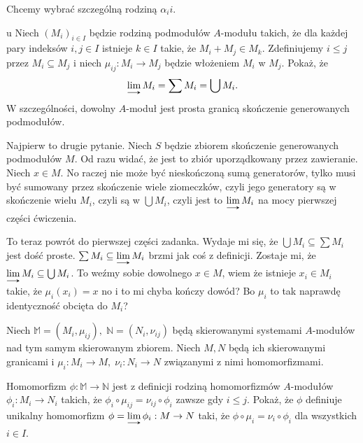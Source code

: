 \documentclass{article}
\begin{document}
Chcemy wybrać szczególną rodziną $\alpha_ii$. 

\begin{problem}[17]{u}
Niech $(M_i)_{i\in I}$ będzie rodziną podmodułów $A$-modułu takich, że dla każdej pary indeksów $i,j\in I$ istnieje $k\in I$ takie, że $M_i+M_j\in M_k$. Zdefiniujemy $i\leq j$ przez $M_i\subseteq M_j$ i niech $\mu_{ij}:M_i\to M_j$ będzie włożeniem $M_i$ w $M_j$. Pokaż, że
$$\dlim M_i=\sum M_i=\bigcup M_i.$$
W szczególności, dowolny $A$-moduł jest prosta granicą skończenie generowanych podmodułów.
\end{problem}

Najpierw to drugie pytanie. Niech $S$ będzie zbiorem skończenie generowanych podmodułów $M$. Od razu widać, że jest to zbiór uporządkowany przez zawieranie. Niech $x\in M$. No raczej nie może być nieskończoną sumą generatorów, tylko musi być sumowany przez skończenie wiele ziomeczków, czyli jego generatory są w skończenie wielu $M_i$, czyli są w $\bigcup M_i$, czyli jest to $\dlim M_i$ na mocy pierwszej części ćwiczenia.

To teraz powrót do pierwszej części zadanka. Wydaje mi się, że $\bigcup M_i\subseteq\sum M_i$ jest dość proste. $\sum M_i\subseteq\dlim M_i$ brzmi jak coś z definicji. Zostaje mi, że $\dlim M_i\subseteq\bigcup M_i$. To weźmy sobie dowolnego $x\in M$, wiem że istnieje $x_i\in M_i$ takie, że $\mu_i(x_i)=x$ no i to mi chyba kończy dowód? Bo $\mu_i$ to tak naprawdę identyczność obcięta do $M_i$? 

\begin{problem}[18]{}
Niech $\mathbb{M}=(M_i,\mu_{ij}),\;\mathbb{N}=(N_i,\nu_{ij})$ będą skierowanymi systemami $A$-modułów nad tym samym skierowanym zbiorem. Niech $M,N$ będą ich skierowanymi granicami i $\mu_i:M_i\to M,\;\nu_{i}:N_i\to N$ związanymi z nimi homomorfizmami.

Homomorfizm $\mathbb{\phi}:\mathbb{M}\to\mathbb{N}$ jest z definicji rodziną homomorfizmów $A$-modułów $\phi_i:M_i\to N_i$ takich, że $\phi_i\circ\mu_{ij}=\nu_{ij}\circ\phi_i$ zawsze gdy $i\leq j$. Pokaż, że $\mathbb{\phi}$ definiuje unikalny homomorfizm $\phi=\dlim\phi_i:M\to N$ taki, że $\phi\circ\mu_i=\nu_i\circ\phi_i$ dla wszystkich $i\in I$.
\end{problem}
\end{document}
